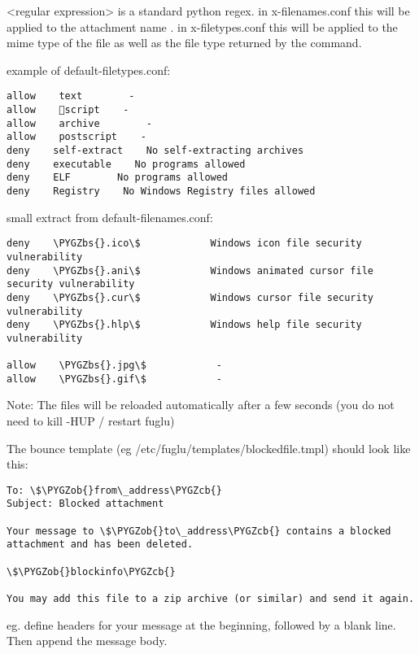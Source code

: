 \documentclass[letterpaper,10pt,english]{sphinxmanual}
\def\PYGZbs{\char`\\}
\def\PYGZob{\char`\{}
\def\PYGZcb{\char`\}}
\begin{document}
\textless{}regular expression\textgreater{} is a standard python regex. in x-filenames.conf this will be applied to the attachment name . in x-filetypes.conf this will be applied to the mime type of the file as well as the file type returned by the  command.

example of default-filetypes.conf:

\begin{Verbatim}[commandchars=\\\{\}]
allow    text        -
allow    script    -
allow    archive        -
allow    postscript    -
deny    self-extract    No self-extracting archives
deny    executable    No programs allowed
deny    ELF        No programs allowed
deny    Registry    No Windows Registry files allowed
\end{Verbatim}

small extract from default-filenames.conf:

\begin{Verbatim}[commandchars=\\\{\}]
deny    \PYGZbs{}.ico\$            Windows icon file security vulnerability
deny    \PYGZbs{}.ani\$            Windows animated cursor file security vulnerability
deny    \PYGZbs{}.cur\$            Windows cursor file security vulnerability
deny    \PYGZbs{}.hlp\$            Windows help file security vulnerability

allow    \PYGZbs{}.jpg\$            -
allow    \PYGZbs{}.gif\$            -
\end{Verbatim}

Note: The files will be reloaded automatically after a few seconds (you do not need to kill -HUP / restart fuglu)

The bounce template (eg /etc/fuglu/templates/blockedfile.tmpl) should look like this:

\begin{Verbatim}[commandchars=\\\{\}]
To: \$\PYGZob{}from\_address\PYGZcb{}
Subject: Blocked attachment

Your message to \$\PYGZob{}to\_address\PYGZcb{} contains a blocked attachment and has been deleted.

\$\PYGZob{}blockinfo\PYGZcb{}

You may add this file to a zip archive (or similar) and send it again.
\end{Verbatim}

eg. define headers for your message at the beginning, followed by a blank line. Then append the message body.
\end{document}
